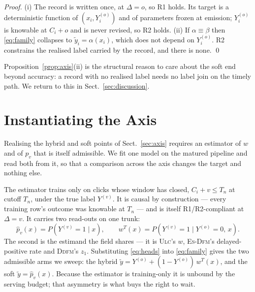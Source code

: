 \documentclass[runningheads]{llncs}
\newcommand{\Yo}{Y^{(o)}}
\newcommand{\Yv}{Y^{(v)}}
\begin{document}
\begin{proof}
(i) The record is written once, at $\Delta = o$, so R1 holds. Its target is a deterministic function
of $(x_i, \Yo_i)$ and of parameters frozen at emission; $\Yo_i$ is knowable at $C_i + o$ and is
never revised, so R2 holds. (ii) If $\alpha \equiv \beta$ then \eqref{eq:family} collapses to
$\tilde y_i = \alpha(x_i)$, which does not depend on $\Yo_i$. R2 constrains the realised label
carried by the record, and there is none. \qed
\end{proof}

Proposition~\ref{prop:axis}(ii) is the structural reason to care about the soft end beyond accuracy:
a record with no realised label needs no label join on the timely path. We return to this in
Sect.~\ref{sec:discussion}.

\section{Instantiating the Axis}\label{sec:method}

Realising the hybrid and soft points of Sect.~\ref{sec:axis} requires an estimator of $w$ and of
$p_v$ that is itself admissible. We fit one model on the matured pipeline and read both from it, so
that a comparison across the axis changes the target and nothing else.

The estimator trains only on clicks whose window has closed, $C_i + v \le T_n$ at cutoff $T_n$,
under the true label $\Yv$. It is causal by construction --- every training row's outcome was
knowable at $T_n$ --- and is itself R1/R2-compliant at $\Delta = v$. It carries two read-outs on one
trunk:
\begin{equation}
\hat p_v(x) = P(\Yv = 1 \mid x),
\qquad
w^{T}(x) = P(\Yv = 1 \mid \Yo = 0,\, x).
\label{eq:heads}
\end{equation}
The second is the estimand the field shares --- it is \textsc{Ulc}'s $w$, \textsc{Es-Dfm}'s
delayed-positive rate and \textsc{Ddfm}'s $z_1$. Substituting \eqref{eq:heads} into
\eqref{eq:family} gives the two admissible arms we sweep: the hybrid
$\tilde y = \Yo + (1-\Yo)\,w^{T}(x)$, and the soft $\tilde y = \hat p_v(x)$. Because the estimator
is training-only it is unbound by the serving budget; that asymmetry is what buys the right to wait.
\end{document}
